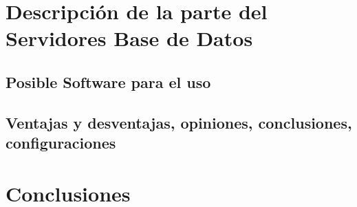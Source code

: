 \section{Descripción de la parte del Servidores Base de Datos}

\subsection{Posible Software para el uso}

\subsection{Ventajas y desventajas, opiniones, conclusiones, configuraciones}
\section{Conclusiones}

\label{UltimaPagina} %

